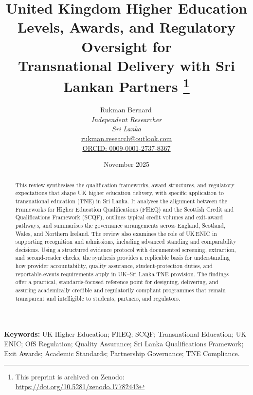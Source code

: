 \documentclass[11pt,a4paper]{article}
\title{
United Kingdom Higher Education Levels, Awards, and Regulatory Oversight for\\
Transnational Delivery with Sri Lankan Partners%
\footnote{This preprint is archived on Zenodo: \url{https://doi.org/10.5281/zenodo.17782443}}
}
\author{%
  Rukman Bernard\,\orcidlink{0009-0001-2737-8367}\\[0.75ex]
  \textit{Independent Researcher}\\
  \textit{Sri Lanka}\\
  \href{mailto:rukman.research@outlook.com}{rukman.research@outlook.com}\\
  \href{https://orcid.org/0009-0001-2737-8367}{ORCID: 0009-0001-2737-8367}
}
\date{November 2025} %
\begin{document}

\maketitle

\begin{abstract}
This review synthesises the qualification frameworks, award structures, and regulatory
expectations that shape UK higher education delivery, with specific application to
transnational education (TNE) in Sri Lanka. It analyses the alignment between the Frameworks
for Higher Education Qualifications (FHEQ) and the Scottish Credit and Qualifications
Framework (SCQF), outlines typical credit volumes and exit-award pathways, and summarises the
governance arrangements across England, Scotland, Wales, and Northern Ireland. The review also
examines the role of UK\,ENIC in supporting recognition and admissions, including advanced
standing and comparability decisions. Using a structured evidence protocol with documented
screening, extraction, and second-reader checks, the synthesis provides a replicable basis for
understanding how provider accountability, quality assurance, student-protection duties, and
reportable-events requirements apply in UK--Sri Lanka TNE provision. The findings offer a
practical, standards-focused reference point for designing, delivering, and assuring
academically credible and regulatorily compliant programmes that remain transparent and
intelligible to students, partners, and regulators.
\end{abstract}
\textbf{Keywords:} UK Higher Education; FHEQ; SCQF; Transnational Education;
UK ENIC; OfS Regulation; Quality Assurance; Sri Lanka Qualifications Framework;
Exit Awards; Academic Standards; Partnership Governance; TNE Compliance.


\tableofcontents
\clearpage
















\appendix




\end{document}
